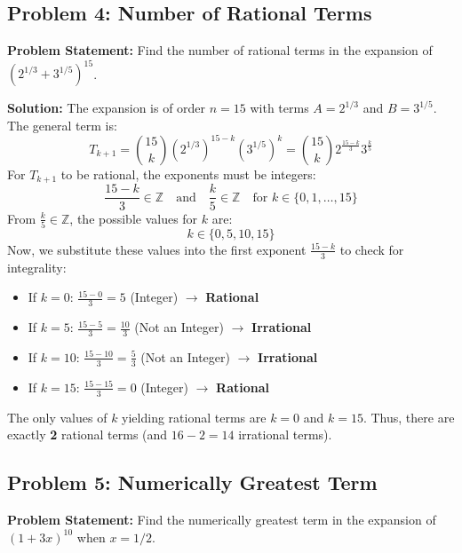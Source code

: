 \documentclass[10pt,journal,compsoc,onecolumn]{IEEEtran}
\begin{document}
\subsection{Problem 4: Number of Rational Terms}

\textbf{Problem Statement:}
Find the number of rational terms in the expansion of $\left(2^{1/3} + 3^{1/5}\right)^{15}$.

\textbf{Solution:}
The expansion is of order $n = 15$ with terms $A = 2^{1/3}$ and $B = 3^{1/5}$.
The general term is:
\begin{equation}
T_{k+1} = \binom{15}{k} \left(2^{1/3}\right)^{15-k} \left(3^{1/5}\right)^k = \binom{15}{k} 2^{\frac{15-k}{3}} 3^{\frac{k}{5}}
\end{equation}
For $T_{k+1}$ to be rational, the exponents must be integers:
\begin{equation}
\frac{15-k}{3} \in \mathbb{Z} \quad \text{and} \quad \frac{k}{5} \in \mathbb{Z} \quad \text{for } k \in \{0, 1, \ldots, 15\}
\end{equation}
From $\frac{k}{5} \in \mathbb{Z}$, the possible values for $k$ are:
\begin{equation}
k \in \{0, 5, 10, 15\}
\end{equation}
Now, we substitute these values into the first exponent $\frac{15-k}{3}$ to check for integrality:
\begin{itemize}
    \item If $k = 0$: $\frac{15-0}{3} = 5$ (Integer) $\rightarrow$ \textbf{Rational}
    \item If $k = 5$: $\frac{15-5}{3} = \frac{10}{3}$ (Not an Integer) $\rightarrow$ \textbf{Irrational}
    \item If $k = 10$: $\frac{15-10}{3} = \frac{5}{3}$ (Not an Integer) $\rightarrow$ \textbf{Irrational}
    \item If $k = 15$: $\frac{15-15}{3} = 0$ (Integer) $\rightarrow$ \textbf{Rational}
\end{itemize}
The only values of $k$ yielding rational terms are $k = 0$ and $k = 15$.
Thus, there are exactly \textbf{2} rational terms (and $16 - 2 = 14$ irrational terms).

\subsection{Problem 5: Numerically Greatest Term}

\textbf{Problem Statement:}
Find the numerically greatest term in the expansion of $(1 + 3x)^{10}$ when $x = 1/2$.
\end{document}
